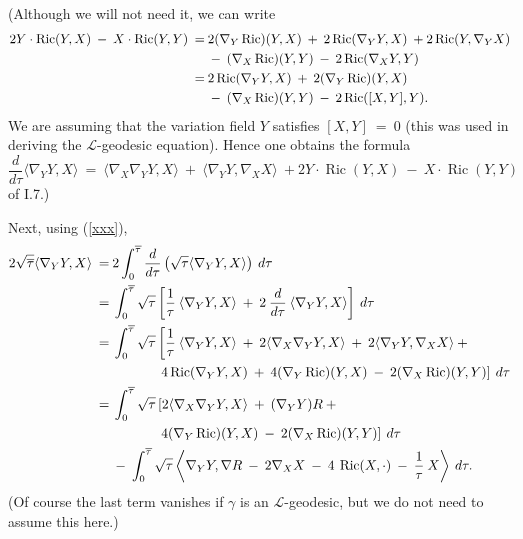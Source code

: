 \documentclass[12pt]{amsart}
\newcommand{\Ric}{\operatorname{Ric}}
\numberwithin{equation}{section}
\theoremstyle{plain}
\theoremstyle{definition}
\theoremstyle{remark}
\begin{document}
(Although we will not need it, we can write
\begin{align}
2 Y \cdot \Ric(Y, X) \: - \: X \cdot \Ric(Y, Y) \: = \: &
2 (\nabla_Y \Ric)(Y, X) \: + \:
2 \Ric(\nabla_Y Y, X) \: + 2 \Ric(Y, \nabla_Y X) \\
& - \: 
(\nabla_X \Ric) (Y, Y) \: - \: 
2 \Ric(\nabla_X Y, Y) \notag \\
 = \: &
2 \Ric ( \nabla_Y Y, X ) \: + \:
2 (\nabla_Y \Ric) (Y, X) \notag \\
& - \:
(\nabla_X \Ric) (Y, Y) \: - \: 
2 \Ric([X, Y], Y).
\notag
\end{align}
We are assuming that the variation field $Y$ satisfies $[X, Y] \: = \: 0$
(this was used in deriving the ${\mathcal L}$-geodesic equation).
Hence one obtains the formula
\begin{equation}
\frac{d}{d\tau} \langle \nabla_Y Y, X \rangle \: = \:
\langle \nabla_X \nabla_Y Y, X \rangle \: + \:
\langle \nabla_Y Y, \nabla_X X \rangle \: + 
2 Y \cdot \Ric(Y, X) \: - \: X \cdot \Ric(Y, Y)
\end{equation}
of I.7.)

Next, using (\ref{xxx}),
\begin{align}
2 \sqrt{\overline{\tau}} \langle \nabla_Y Y, X \rangle \: = \: &
2 \int_0^{\overline{\tau}} \frac{d}{d\tau} 
\left( \sqrt{\tau} \langle \nabla_Y Y, X \rangle  \right) \: d\tau \\
 = \: &
\int_0^{\overline{\tau}}
\sqrt{\tau} \left[ \frac{1}{\tau} \: 
\langle \nabla_Y Y, X \rangle \: + \:
2  \:  \frac{d}{d\tau} \: \langle \nabla_Y Y, X \rangle \right]
\: d\tau \notag \\
\: = \: & 
\int_0^{\overline{\tau}}
\sqrt{\tau} \left[ \frac{1}{\tau} \: 
\langle \nabla_Y Y, X \rangle \: + \:
2 \langle \nabla_X \nabla_Y Y, X \rangle \: + \:
2 \langle \nabla_Y Y, \nabla_X X \rangle \: + \: \right. \notag \\
& \left. 
\: \: \: \: \:\: \: \: \: \: \: \: \: \: \: 4 \Ric ( \nabla_Y Y, X ) \: + \:
4 (\nabla_Y \Ric) (Y, X) \: - \: 2
(\nabla_X \Ric) (Y, Y) \right] \: d\tau \notag \\
\: = \: & 
\int_0^{\overline{\tau}}
\sqrt{\tau} \left[
2 \langle \nabla_X \nabla_Y Y, X \rangle \: + \:
(\nabla_Y Y) R \: + \: \right. \notag \\
& \left. 
\: \: \: \: \: \: \: \: \: \: \: \: \: \: \: 
4 (\nabla_Y \Ric) (Y, X) \: - \: 2
(\nabla_X \Ric) (Y, Y) \right] \: d\tau \notag \\
& - \:  
\int_0^{\overline{\tau}}
\sqrt{\tau} \left\langle \nabla_Y Y,
\nabla R
\: - \: 2 \nabla_X X  \: - \: 4 \: \Ric(X, \cdot) \: -\: \frac{1}{\tau}
\: X
\right\rangle \: d\tau. \notag
\end{align}
(Of course the last term vanishes if $\gamma$ is an ${\mathcal L}$-geodesic,
but we do not need to assume this here.)
\end{document}
